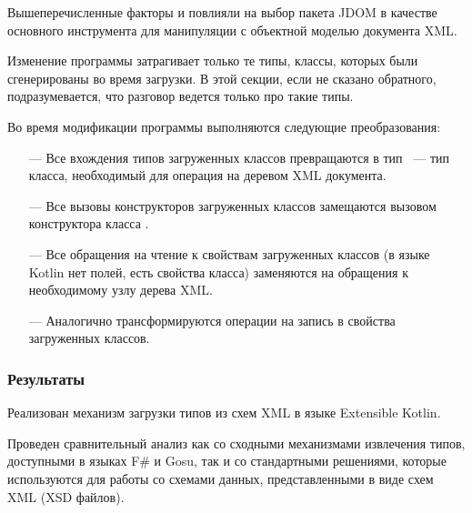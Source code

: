 Вышеперечисленные факторы и повлияли на выбор пакета JDOM в качестве основного инструмента для манипуляции с объектной моделью документа XML.

Изменение программы затрагивает только те типы, классы, которых были сгенерированы во время загрузки. В этой секции, если не сказано обратного, подразумевается, что разговор ведется только про такие типы.

Во время модификации программы выполняются следующие преобразования:
\begin{itemize}
\item[---] Все вхождения типов загруженных классов превращаются в тип ~--- тип класса, необходимый для операция на деревом XML документа.
\item[---] Все вызовы конструкторов загруженных классов замещаются вызовом конструктора класса .
\item[---] Все обращения на чтение к свойствам загруженных классов (в языке Kotlin нет полей, есть свойства класса) заменяются на обращения к необходимому узлу дерева XML.
\item[---] Аналогично трансформируются операции на запись в свойства загруженных классов.
\end{itemize}

\subsubsection{Результаты}
Реализован механизм загрузки типов из схем XML в языке Extensible Kotlin.

Проведен сравнительный анализ как со сходными механизмами извлечения типов, доступными в языках F\# и Gosu, так и со стандартными решениями, которые используются для работы со схемами данных, представленными в виде схем XML (XSD файлов).